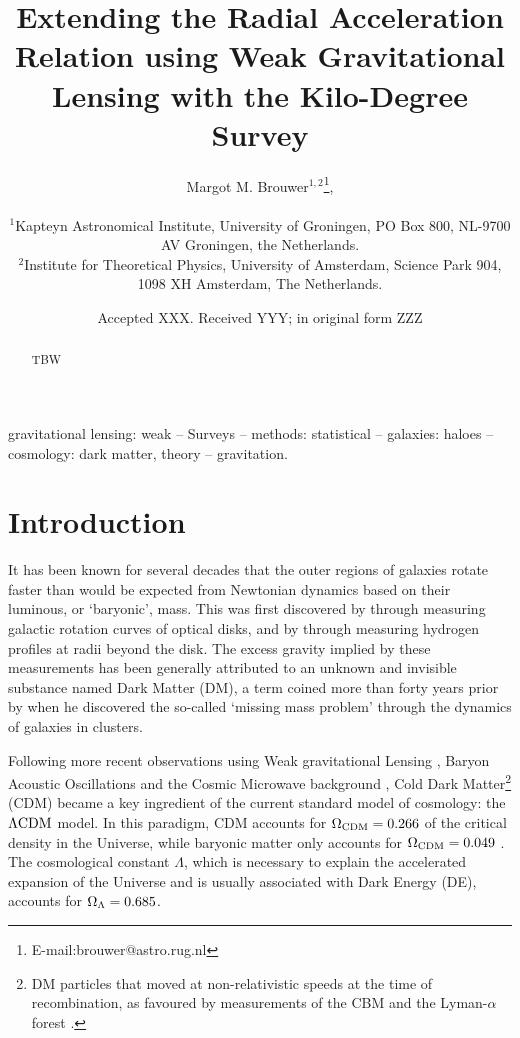 \documentclass[fleqn,usenatbib]{mnras}
\title[Extending the RAR with KiDS weak lensing]{Extending the Radial Acceleration Relation using Weak Gravitational Lensing with the Kilo-Degree Survey}
\author[M. M. Brouwer et al.]{Margot M. Brouwer$^{1,2}$\thanks{E-mail:brouwer@astro.rug.nl},
	\\
	\\
	$^{1}$Kapteyn Astronomical Institute, University of Groningen, PO Box 800, NL-9700 AV Groningen, the Netherlands.\\
	$^{2}$Institute for Theoretical Physics, University of Amsterdam, Science Park 904, 1098 XH Amsterdam, The Netherlands. \\
}
\date{Accepted XXX. Received YYY; in original form ZZZ}
\newcommand{\lcdm}{{\rm \Lambda CDM}}
\begin{document}
\label{firstpage}
\pagerange{\pageref{firstpage}--\pageref{lastpage}}
\maketitle

\begin{abstract}
TBW
\end{abstract}


\begin{keywords}
gravitational lensing: weak -- Surveys -- methods: statistical -- galaxies: haloes -- cosmology: dark matter, theory -- gravitation.
\\
\end{keywords}

\clearpage




\section{Introduction}
\label{sec:introduction}

It has been known for several decades that the outer regions of galaxies rotate faster than would be expected from Newtonian dynamics based on their luminous, or `baryonic', mass. This was first discovered by \cite{rubin1983} through measuring galactic rotation curves of optical disks, and by \cite{bosma1981} through measuring hydrogen profiles at radii beyond the disk. The excess gravity implied by these measurements has been generally attributed to an unknown and invisible substance named Dark Matter (DM), a term coined more than forty years prior by \cite{zwicky1937} when he discovered the so-called `missing mass problem' through the dynamics of galaxies in clusters.

Following more recent observations using Weak gravitational Lensing \cite[WL,][]{hoekstra2004,linden2014,mandelbaum2015}, Baryon Acoustic Oscillations \cite[BAO's,][]{eisenstein2005,blake2011} and the Cosmic Microwave background \cite[CMB,][]{spergel2003,planck2014}, Cold Dark Matter\footnote{DM particles that moved at non-relativistic speeds at the time of recombination, as favoured by measurements of the CBM \cite[]{planck2014} and the Lyman-$\alpha$ forest \cite[]{viel2013}.} (CDM) became a key ingredient of the current standard model of cosmology: the $\lcdm$ model. In this paradigm, CDM accounts for $\Omega_{\rm CDM}=0.266$ of the critical density in the Universe, while baryonic matter only accounts for $\Omega_{\rm CDM}=0.049$ \cite[]{planck2018}. The cosmological constant $\Lambda$, which is necessary to explain the accelerated expansion of the Universe and is usually associated with Dark Energy (DE), accounts for $\Omega_{\rm \Lambda}=0.685$.
\end{document}
